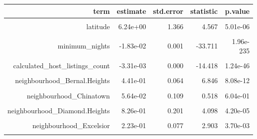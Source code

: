 \documentclass[justified, 11pt]{scrartcl}\usepackage[]{graphicx}\usepackage[]{xcolor}
\newenvironment{knitrout}{}{} %
\begin{document}
\begin{knitrout}
\begin{table}
\begin{tabular}{r|r|r|r|r}
\hline
term & estimate & std.error & statistic & p.value\\
\hline
\cellcolor{gray!6}{(Intercept)} & \cellcolor{gray!6}{2.55e+02} & \cellcolor{gray!6}{142.613} & \cellcolor{gray!6}{1.791} & \cellcolor{gray!6}{7.33e-02}\\
\hline
latitude & 6.24e+00 & 1.366 & 4.567 & 5.01e-06\\
\hline
\cellcolor{gray!6}{longitude} & \cellcolor{gray!6}{3.97e+00} & \cellcolor{gray!6}{1.017} & \cellcolor{gray!6}{3.900} & \cellcolor{gray!6}{9.70e-05}\\
\hline
minimum\_nights & -1.83e-02 & 0.001 & -33.711 & 1.96e-235\\
\hline
\cellcolor{gray!6}{number\_of\_reviews} & \cellcolor{gray!6}{-1.35e-03} & \cellcolor{gray!6}{0.000} & \cellcolor{gray!6}{-17.150} & \cellcolor{gray!6}{5.88e-65}\\
\hline
calculated\_host\_listings\_count & -3.31e-03 & 0.000 & -14.418 & 1.24e-46\\
\hline
\cellcolor{gray!6}{availability\_365} & \cellcolor{gray!6}{-2.28e-04} & \cellcolor{gray!6}{0.000} & \cellcolor{gray!6}{-4.340} & \cellcolor{gray!6}{1.44e-05}\\
\hline
neighbourhood\_Bernal.Heights & 4.41e-01 & 0.064 & 6.846 & 8.08e-12\\
\hline
\cellcolor{gray!6}{neighbourhood\_Castro.Upper.Market} & \cellcolor{gray!6}{5.58e-01} & \cellcolor{gray!6}{0.087} & \cellcolor{gray!6}{6.394} & \cellcolor{gray!6}{1.69e-10}\\
\hline
neighbourhood\_Chinatown & 5.64e-02 & 0.109 & 0.518 & 6.04e-01\\
\hline
\cellcolor{gray!6}{neighbourhood\_Crocker.Amazon} & \cellcolor{gray!6}{3.69e-01} & \cellcolor{gray!6}{0.090} & \cellcolor{gray!6}{4.106} & \cellcolor{gray!6}{4.06e-05}\\
\hline
neighbourhood\_Diamond.Heights & 8.26e-01 & 0.201 & 4.098 & 4.20e-05\\
\hline
\cellcolor{gray!6}{neighbourhood\_Downtown.Civic.Center} & \cellcolor{gray!6}{9.89e-02} & \cellcolor{gray!6}{0.096} & \cellcolor{gray!6}{1.036} & \cellcolor{gray!6}{3.00e-01}\\
\hline
neighbourhood\_Excelsior & 2.23e-01 & 0.077 & 2.903 & 3.70e-03\\
\hline
\cellcolor{gray!6}{neighbourhood\_Financial.District} & \cellcolor{gray!6}{5.99e-01} & \cellcolor{gray!6}{0.104} & \cellcolor{gray!6}{5.744} & \cellcolor{gray!6}{9.52e-09}\\

\end{tabular}
\end{table}
\end{knitrout}
\end{document}
